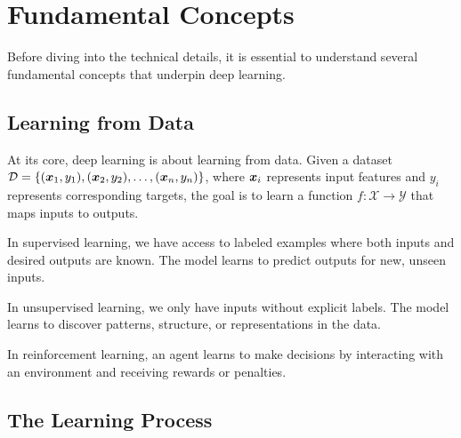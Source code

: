 
\section{Fundamental Concepts }
\label{sec:fundamental-concepts}

Before diving into the technical details, it is essential to understand several fundamental concepts that underpin deep learning.

\subsection{Learning from Data}

At its core, deep learning is about learning from data. Given a dataset $\mathcal{D} = \{(\boldsymbol{x}_1, y_1), (\boldsymbol{x}_2, y_2), \ldots, (\boldsymbol{x}_n, y_n)\}$, where $\boldsymbol{x}_i$ represents input features and $y_i$ represents corresponding targets, the goal is to learn a function $f: \mathcal{X} \rightarrow \mathcal{Y}$ that maps inputs to outputs.

\begin{definition}
In supervised learning, we have access to labeled examples where both inputs and desired outputs are known. The model learns to predict outputs for new, unseen inputs.
\end{definition}

\begin{definition}
In unsupervised learning, we only have inputs without explicit labels. The model learns to discover patterns, structure, or representations in the data.
\end{definition}

\begin{definition}
In reinforcement learning, an agent learns to make decisions by interacting with an environment and receiving rewards or penalties.
\end{definition}

\subsection{The Learning Process}

